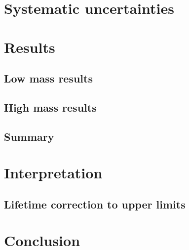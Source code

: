 \subsection{}
\subsection{}

\section{Systematic uncertainties}
\section{Results}
\subsection{Low mass results}
\subsection{High mass results}
\subsection{Summary}

\section{Interpretation}
\subsection{Lifetime correction to upper limits}

\section{Conclusion}
